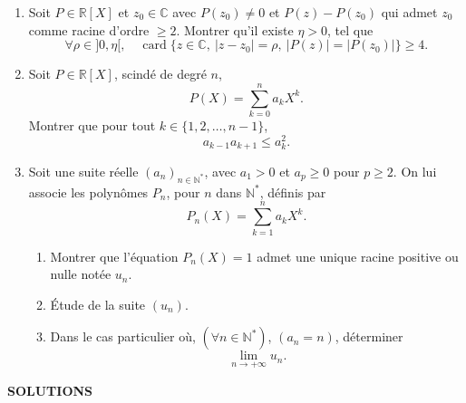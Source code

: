 \begin{enumerate}[label=\arabic*.,leftmargin=2.2em,itemsep=1.1em]
\item Soit $P\in\mathbb R[X]$ et $z_0\in\mathbb C$ avec $P(z_0)\ne0$ et $P(z)-P(z_0)$ qui admet $z_0$ comme racine d'ordre $\ge2$. Montrer qu'il existe $\eta>0$, tel que
\[
\forall\rho\in]0,\eta[,\quad
\operatorname{card}\{z\in\mathbb C,\ |z-z_0|=\rho,\ |P(z)|=|P(z_0)|\}\ge4.
\]

\item Soit $P\in\mathbb R[X]$, scindé de degré $n$,
\[
P(X)=\sum_{k=0}^n a_kX^k.
\]
Montrer que pour tout $k\in\{1,2,\ldots,n-1\}$,
\[
a_{k-1}a_{k+1}\le a_k^2.
\]

\item Soit une suite réelle $(a_n)_{n\in\mathbb N^*}$, avec $a_1>0$ et $a_p\ge0$ pour $p\ge2$. On lui associe les polynômes $P_n$, pour $n$ dans $\mathbb N^*$, définis par
\[
P_n(X)=\sum_{k=1}^n a_kX^k.
\]
\begin{enumerate}[label=\arabic*),leftmargin=2em]
\item Montrer que l'équation $P_n(X)=1$ admet une unique racine positive ou nulle notée $u_n$.
\item Étude de la suite $(u_n)$.
\item Dans le cas particulier où, $(\forall n\in\mathbb N^*)$, $(a_n=n)$, déterminer
\[
\lim_{n\to+\infty}u_n.
\]
\end{enumerate}

\end{enumerate}

\begin{center}
{\Large\sffamily\bfseries\color{BellaLavenderDeep} SOLUTIONS}
\end{center}
\vspace{0.8em}


